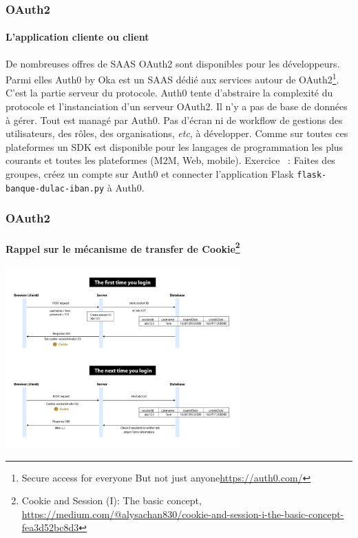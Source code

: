 \documentclass{beamer}
\begin{document}
    \begin{frame}
        \frametitle{OAuth2}
        \framesubtitle{L'application cliente ou client}
        \transdissolve
        De nombreuses offres de SAAS OAuth2 sont disponibles pour les développeurs.
        Parmi elles Auth0 by Oka est un SAAS dédié aux services autour de OAuth2\footnote{Secure access for everyone But not just anyone\url{https://auth0.com/}}.
        \bigbreak
        C'est la partie serveur du protocole.
        Auth0 tente d'abstraire la complexité du protocole et l'instanciation d'un serveur OAuth2.
        Il n'y a pas de base de données à gérer.
        Tout est managé par Auth0.
        Pas d'écran ni de workflow de gestions des utilisateurs, des rôles, des organisations, \textit{etc}, à développer.
        \bigbreak
        Comme sur toutes ces plateformes un SDK est disponible pour les langages de programmation les plus courants et toutes les plateformes (M2M, Web, mobile).
        \bigbreak
        Exercice \execcounterdispinc{}~: Faites des groupes, créez un compte sur Auth0 et connecter l'application Flask \lstinline{flask-banque-dulac-iban.py} à Auth0.
    \end{frame}

    \begin{frame}
        \frametitle{OAuth2}
        \framesubtitle{Rappel sur le mécanisme de transfer de Cookie\footnote{Cookie and Session (I): The basic concept, \url{https://medium.com/@alysachan830/cookie-and-session-i-the-basic-concept-fea3d52bc8d3}}}
        \transdissolve
        \centering
        \includegraphics[width=9cm]{image/cookie-session}
    \end{frame}
\end{document}
